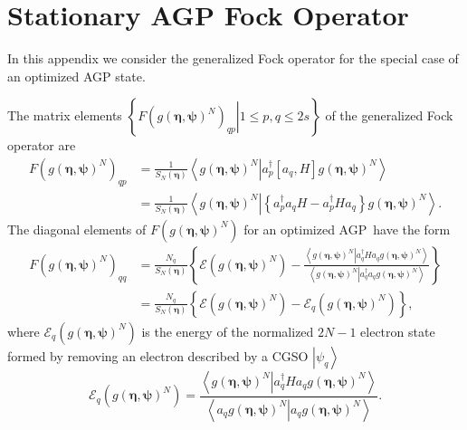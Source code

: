 \documentclass[aps,preprint]{revtex4}%
\begin{document}
\section{Stationary AGP Fock Operator\label{AGPFock}}

In this appendix we consider the generalized Fock operator for the special
case of an optimized AGP state.

The matrix elements $\left\{  \left.  F\left(  g\left(  \bm{\eta
},\bm{\psi}\right)  ^{N}\right)  _{qp}\right\vert 1\leq p,q\leq2s\right\}  $
of the generalized Fock operator are
\begin{align}
F\left(  g\left(  \bm{\eta},\bm{\psi}\right)  ^{N}\right)  _{qp}  &  =\frac
{1}{S_{N}\left(  \bm{\eta}\right)  }\left\langle \left.  g\left(
\bm{\eta},\bm{\psi}\right)  ^{N}\right\vert a_{p}^{\dagger}\left[
a_{q},H\right]  g\left(  \bm{\eta},\bm{\psi}\right)  ^{N}\right\rangle
\nonumber\\
&  =\frac{1}{S_{N}\left(  \bm{\eta}\right)  }\left\langle \left.  g\left(
\bm{\eta},\bm{\psi}\right)  ^{N}\right\vert \left\{  a_{p}^{\dagger}%
a_{q}H-a_{p}^{\dagger}Ha_{q}\right\}  g\left(  \bm{\eta},\bm{\psi }\right)
^{N}\right\rangle .
\end{align}
The diagonal elements of $F\left(  g\left(  \bm{\eta},\bm{\psi
}\right)  ^{N}\right)  $ for an optimized AGP\ have the form
\begin{align}
F\left(  g\left(  \bm{\eta},\bm{\psi}\right)  ^{N}\right)  _{qq}  &
=\frac{N_{q}}{S_{N}\left(  \bm{\eta}\right)  }\left\{  \mathcal{E}\left(
g\left(  \bm{\eta},\bm{\psi}\right)  ^{N}\right)  -\frac{\left\langle \left.
g\left(  \bm{\eta},\bm{\psi}\right)  ^{N}\right\vert a_{q}^{\dagger}%
Ha_{q}g\left(  \bm{\eta},\bm{\psi}\right)  ^{N}\right\rangle }{\left\langle
\left.  g\left(  \bm{\eta},\bm{\psi }\right)  ^{N}\right\vert a_{q}^{\dagger
}a_{q}g\left(  \bm{\eta },\bm{\psi}\right)  ^{N}\right\rangle }\right\}
\nonumber\\
&  =\frac{N_{q}}{S_{N}\left(  \bm{\eta}\right)  }\left\{  \mathcal{E}\left(
g\left(  \bm{\eta},\bm{\psi}\right)  ^{N}\right)  -\mathcal{E}_{q}\left(
g\left(  \bm{\eta},\bm{\psi}\right)  ^{N}\right)  \right\}  ,
\end{align}
where $\mathcal{E}_{q}\left(  g\left(  \bm{\eta},\bm{\psi}\right)
^{N}\right)  $ is the energy of the normalized $2N-1$ electron state formed by
removing an electron described by a CGSO $\left\vert \psi_{q}\right\rangle $
\begin{equation}
\mathcal{E}_{q}\left(  g\left(  \bm{\eta},\bm{\psi}\right)  ^{N}\right)
=\frac{\left\langle \left.  g\left(  \bm{\eta},\bm{\psi }\right)
^{N}\right\vert a_{q}^{\dagger}Ha_{q}g\left(  \bm{\eta },\bm{\psi}\right)
^{N}\right\rangle }{\left\langle \left.  a_{q}g\left(
\bm{\eta},\bm{\psi}\right)  ^{N}\right\vert a_{q}g\left(
\bm{\eta},\bm{\psi}\right)  ^{N}\right\rangle }.
\end{equation}
\end{document}
